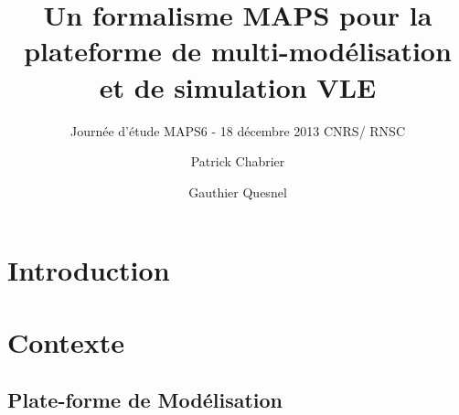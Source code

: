 \documentclass[xetex, compress, table, svgnames]{beamer}
\title[VLE]{Un formalisme MAPS pour la plateforme de multi-modélisation et de simulation VLE}
\subtitle[]{Journée d'étude MAPS6 - 18 décembre 2013 CNRS/ RNSC}
\author[Chabrier \emph{et al.}]{Patrick Chabrier \and
  Gauthier Quesnel}
\institute[INRA MIA MIAT]{INRA - MIAT - RECORD}
\date{}
\begin{document}
\begin{frame}
  \titlepage
\end{frame}

\begin{frame}
  \tableofcontents
\end{frame}

\section{Introduction}

\section{Contexte}

\subsection{Plate-forme de Modélisation}
\end{document}
